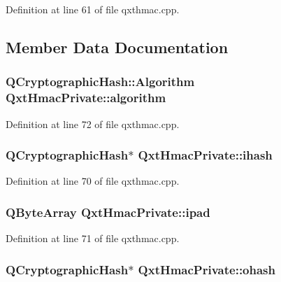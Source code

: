 Definition at line 61 of file qxthmac.\-cpp.



\subsection{Member Data Documentation}
\hypertarget{class_qxt_hmac_private_a727bde03883e6235b3f6d09d60cffd8b}{
\subsubsection[{algorithm}]{\setlength{\rightskip}{0pt plus 5cm}Q\-Cryptographic\-Hash\-::\-Algorithm Qxt\-Hmac\-Private\-::algorithm}}\label{class_qxt_hmac_private_a727bde03883e6235b3f6d09d60cffd8b}


Definition at line 72 of file qxthmac.\-cpp.

\hypertarget{class_qxt_hmac_private_a58e5aca9ff01b6c0a74bc9908baea4ac}{
\subsubsection[{ihash}]{\setlength{\rightskip}{0pt plus 5cm}Q\-Cryptographic\-Hash$\ast$ Qxt\-Hmac\-Private\-::ihash}}\label{class_qxt_hmac_private_a58e5aca9ff01b6c0a74bc9908baea4ac}


Definition at line 70 of file qxthmac.\-cpp.

\hypertarget{class_qxt_hmac_private_a8a4243cf84dc4de4934b6d1fdf998eab}{
\subsubsection[{ipad}]{\setlength{\rightskip}{0pt plus 5cm}Q\-Byte\-Array Qxt\-Hmac\-Private\-::ipad}}\label{class_qxt_hmac_private_a8a4243cf84dc4de4934b6d1fdf998eab}


Definition at line 71 of file qxthmac.\-cpp.

\hypertarget{class_qxt_hmac_private_ab57ea96b732394d617e3841d3c097183}{
\subsubsection[{ohash}]{\setlength{\rightskip}{0pt plus 5cm}Q\-Cryptographic\-Hash$\ast$ Qxt\-Hmac\-Private\-::ohash}}\label{class_qxt_hmac_private_ab57ea96b732394d617e3841d3c097183}


